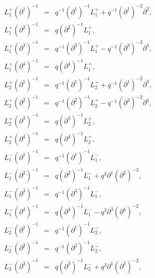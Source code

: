 \documentclass[a4paper,11pt,oneside]{article}
\begin{document}
\begin{eqnarray}
L_{1}^{+}\left( \partial ^{1}\right) ^{-1} &=&q^{-1}\left( \partial
^{1}\right) ^{-1}L_{1}^{+}+q^{-1}\left( \partial ^{1}\right) ^{-2}\partial
^{2}, \\
L_{1}^{+}\left( \partial ^{2}\right) ^{-1} &=&q\left( \partial ^{2}\right)
^{-1}L_{1}^{+},  \nonumber \\
L_{1}^{+}\left( \partial ^{3}\right) ^{-1} &=&q^{-1}\left( \partial
^{3}\right) ^{-1}L_{1}^{+}-q^{-1}\left( \partial ^{3}\right) ^{-2}\partial
^{4},  \nonumber \\
L_{1}^{+}\left( \partial ^{4}\right) ^{-1} &=&q\left( \partial ^{4}\right)
^{-1}L_{1}^{+},  \nonumber \\[0.16in]
L_{2}^{+}\left( \partial ^{1}\right) ^{-1} &=&q^{-1}\left( \partial
^{1}\right) ^{-1}L_{2}^{+}+q^{-1}\left( \partial ^{1}\right) ^{-2}\partial
^{3}, \\
L_{2}^{+}\left( \partial ^{2}\right) ^{-1} &=&q^{-1}\left( \partial
^{2}\right) ^{-1}L_{2}^{+}-q^{-1}\left( \partial ^{2}\right) ^{-2}\partial
^{4},  \nonumber \\
L_{2}^{+}\left( \partial ^{3}\right) ^{-1} &=&q\left( \partial ^{3}\right)
^{-1}L_{2}^{+},  \nonumber \\
L_{2}^{+}\left( \partial ^{4}\right) ^{-1} &=&q\left( \partial ^{4}\right)
^{-1}L_{2}^{+},  \nonumber \\[0.4cm]
L_{1}^{-}\left( \partial ^{1}\right) ^{-1} &=&q^{-1}\left( \partial
^{1}\right) ^{-1}L_{1}^{-}, \\
L_{1}^{-}\left( \partial ^{2}\right) ^{-1} &=&q\left( \partial ^{2}\right)
^{-1}L_{1}^{-}+q^{3}\partial ^{1}\left( \partial ^{2}\right) ^{-2}, 
\nonumber \\
L_{1}^{-}\left( \partial ^{3}\right) ^{-1} &=&q^{-1}\left( \partial
^{3}\right) ^{-1}L_{1}^{-},  \nonumber \\
L_{1}^{-}\left( \partial ^{4}\right) ^{-1} &=&q\left( \partial ^{4}\right)
^{-1}L_{1}^{-}-q^{3}\partial ^{3}\left( \partial ^{4}\right) ^{-2}, 
\nonumber \\[0.4cm]
L_{2}^{-}\left( \partial ^{1}\right) ^{-1} &=&q^{-1}\left( \partial
^{1}\right) ^{-1}L_{2}^{-}, \\
L_{2}^{-}\left( \partial ^{2}\right) ^{-1} &=&q^{-1}\left( \partial
^{2}\right) ^{-1}L_{2}^{-},  \nonumber \\
L_{2}^{-}\left( \partial ^{3}\right) ^{-1} &=&q\left( \partial ^{3}\right)
^{-1}L_{2}^{-}+q^{3}\partial ^{1}\left( \partial ^{3}\right) ^{-2}, 
\nonumber \\

\end{eqnarray}
\end{document}
